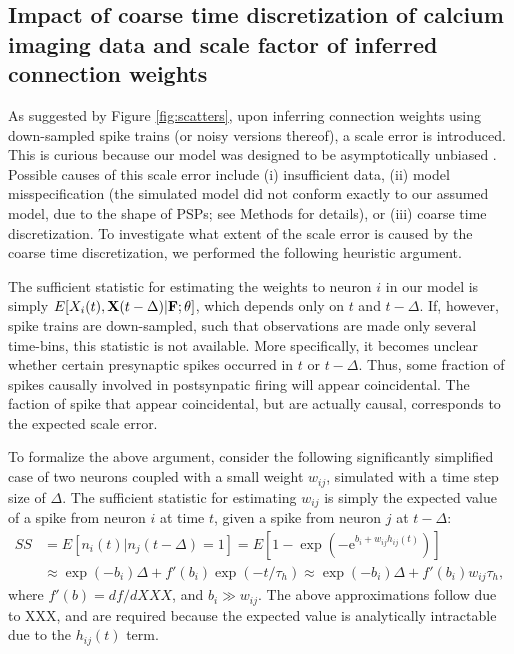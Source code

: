 \documentclass[aoas,preprint]{imsart}
\newcommand{\bth}{\mathbf{\theta}}
\newcommand{\bF}{{\bf F}}
\newcommand{\bX}{{\bf X}}
\begin{document}
\subsection{Impact of coarse time discretization of calcium imaging data and scale factor of inferred connection weights} \label{sec:scale}

As suggested by Figure \ref{fig:scatters}, upon inferring connection weights using down-sampled spike trains (or noisy versions thereof), a scale error is introduced. This is curious because our model was designed to be asymptotically unbiased \cite{PAN03d}. Possible causes of this scale error include (i) insufficient data,  (ii) model misspecification (the simulated model did not conform exactly to our assumed model, due to the shape of PSPs; see Methods for details), or (iii) coarse time discretization.  To investigate what extent of the scale error is caused by the coarse time discretization, we performed the following heuristic argument.

The sufficient statistic for estimating the weights to neuron $i$ in our model is simply $E[X_i(t), \bX (t-\Delta)| \bF; \bth]$, which depends only on $t$ and $t-\Delta$.  If, however, spike trains are down-sampled, such that observations are made only several time-bins, this statistic is not available.  More specifically, it becomes unclear whether certain presynaptic spikes occurred in $t$ or $t-\Delta$.  Thus, some fraction of spikes causally involved in postsynpatic firing will appear coincidental.  The faction of spike that appear coincidental, but are actually causal, corresponds to the expected scale error.

To formalize the above argument, consider the following significantly simplified case of two neurons coupled with a small weight $w_{ij}$, simulated with a time step size of $\Delta$. The sufficient statistic for estimating $w_{ij}$ is simply the expected value of a spike from neuron $i$ at time $t$, given a spike from neuron $j$ at $t-\Delta$:
\begin{align} %
SS&=E\left[n_i(t) | n_j(t-\Delta)=1\right] %
=E\left[1-\exp\left(-\text{e}^{b_i+w_{ij}h_{ij}(t)}\right)\right]  \nonumber \\
&\approx \exp(-b_i) \Delta + f'(b_i) \exp(-t/\tau_h) %
\approx  \exp(-b_i) \Delta + f'(b_i) w_{ij}\tau_h, \label{eqn:SS}
\end{align}
where $f'(b)=df/dXXX$, and $b_i \gg w_{ij}$. The above approximations follow due to XXX, and are required because the expected value is analytically intractable due to the $h_{ij}(t)$ term. 
\end{document}
